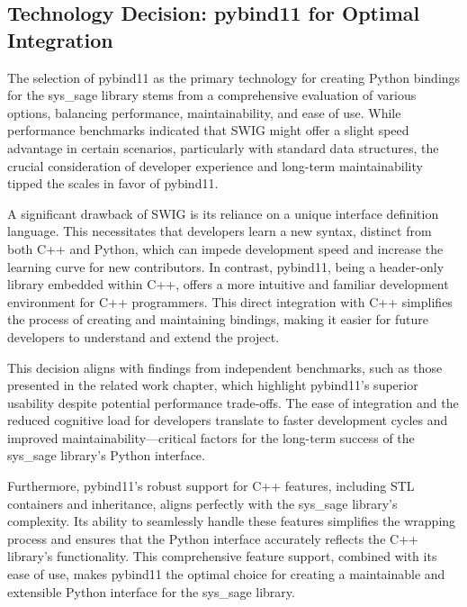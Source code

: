 \subsection{Technology Decision: pybind11 for Optimal Integration}

The selection of pybind11 as the primary technology for creating Python bindings for the sys\_sage library stems from a comprehensive evaluation of various options, balancing performance, maintainability, and ease of use. While performance benchmarks indicated that SWIG might offer a slight speed advantage in certain scenarios, particularly with standard data structures, the crucial consideration of developer experience and long-term maintainability tipped the scales in favor of pybind11.

A significant drawback of SWIG is its reliance on a unique interface definition language. This necessitates that developers learn a new syntax, distinct from both C++ and Python, which can impede development speed and increase the learning curve for new contributors. In contrast, pybind11, being a header-only library embedded within C++, offers a more intuitive and familiar development environment for C++ programmers. This direct integration with C++ simplifies the process of creating and maintaining bindings, making it easier for future developers to understand and extend the project.

This decision aligns with findings from independent benchmarks, such as those presented in the related work chapter, which highlight pybind11's superior usability despite potential performance trade-offs. The ease of integration and the reduced cognitive load for developers translate to faster development cycles and improved maintainability—critical factors for the long-term success of the sys\_sage library's Python interface.

Furthermore, pybind11's robust support for C++ features, including STL containers and inheritance, aligns perfectly with the sys\_sage library's complexity. Its ability to seamlessly handle these features simplifies the wrapping process and ensures that the Python interface accurately reflects the C++ library's functionality. This comprehensive feature support, combined with its ease of use, makes pybind11 the optimal choice for creating a maintainable and extensible Python interface for the sys\_sage library.